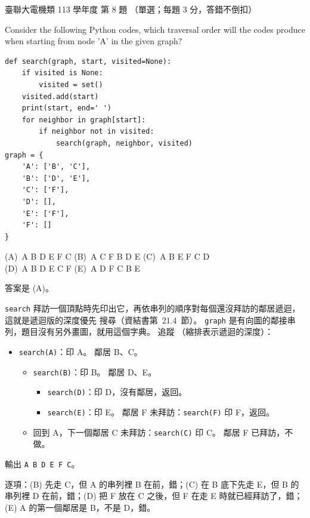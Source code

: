 \begin{pastexam}[label={px:ust-113-ee-ds-08}]{臺聯大電機類 113 學年度 第 8 題}
（單選；每題 3 分，答錯不倒扣）

Consider the following Python codes, which traversal order will the codes produce when starting
from node 'A' in the given graph?
\begin{verbatim}
def search(graph, start, visited=None):
    if visited is None:
        visited = set()
    visited.add(start)
    print(start, end=' ')
    for neighbor in graph[start]:
        if neighbor not in visited:
            search(graph, neighbor, visited)
graph = {
    'A': ['B', 'C'],
    'B': ['D', 'E'],
    'C': ['F'],
    'D': [],
    'E': ['F'],
    'F': []
}
\end{verbatim}

(A)~A B D E F C \qquad (B)~A C F B D E \qquad (C)~A B E F C D\\
(D)~A B D E C F \qquad (E)~A D F C B E
\end{pastexam}

\begin{pastsoln}
答案是 (A)。

\texttt{search} 拜訪一個頂點時先印出它，再依串列的順序對每個還沒拜訪的鄰居遞迴，這就是遞迴版的深度優先
搜尋（資結書第~21.4~節）。 \texttt{graph} 是有向圖的鄰接串列，題目沒有另外畫圖，就用這個字典。 追蹤
（縮排表示遞迴的深度）：
\begin{itemize}
\item \texttt{search(A)}：印 A。 鄰居 B、C。
\begin{itemize}
\item \texttt{search(B)}：印 B。 鄰居 D、E。
\begin{itemize}
\item \texttt{search(D)}：印 D，沒有鄰居，返回。
\item \texttt{search(E)}：印 E。 鄰居 F 未拜訪：\texttt{search(F)} 印 F，返回。
\end{itemize}
\item 回到 A，下一個鄰居 C 未拜訪：\texttt{search(C)} 印 C。 鄰居 F 已拜訪，不做。
\end{itemize}
\end{itemize}
輸出 \texttt{A B D E F C}。

逐項：(B) 先走 C，但 A 的串列裡 B 在前，錯；(C) 在 B 底下先走 E，但 B 的串列裡 D 在前，錯；(D) 把 F 放在
C 之後，但 F 在走 E 時就已經拜訪了，錯；(E) A 的第一個鄰居是 B，不是 D，錯。
\end{pastsoln}
